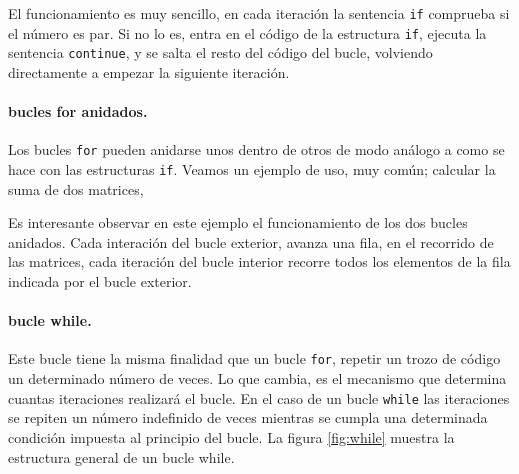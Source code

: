 
El funcionamiento es muy sencillo, en cada iteración la sentencia \texttt{if} comprueba si el número es par. Si no lo es, entra en el código de la estructura \texttt{if}, ejecuta la sentencia \texttt{continue}, y se salta el resto del código del bucle, volviendo directamente a empezar la siguiente iteración.

\paragraph{bucles for anidados.} Los bucles \texttt{for} pueden anidarse unos dentro de otros de modo análogo a como se hace con las estructuras \texttt{if}. Veamos un ejemplo de uso, muy común; calcular la suma de dos matrices,



Es interesante observar en este ejemplo el funcionamiento de los dos bucles anidados. Cada interación del bucle exterior, avanza una fila, en el recorrido de las matrices, cada iteración del bucle interior recorre todos los elementos de la fila indicada por el bucle exterior.

\paragraph{bucle while.}  Este bucle tiene la misma finalidad que un bucle \texttt{for}, repetir un trozo de código un determinado número de veces. Lo que cambia, es el mecanismo que determina cuantas iteraciones realizará el bucle. En el caso de un bucle \texttt{while} las iteraciones se repiten un número indefinido de veces mientras se cumpla una determinada condición impuesta al principio del bucle. La figura \ref{fig:while} muestra la estructura general de un bucle while.

